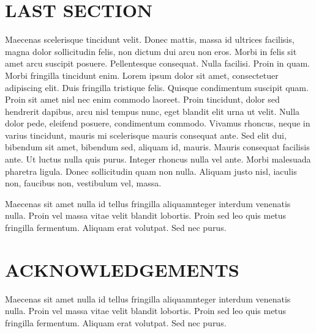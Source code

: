 \documentclass[dvips,11pt,twoside]{article}
\begin{document}
\section{\large\bf LAST SECTION}  
Maecenas scelerisque tincidunt velit.  Donec mattis, massa id ultrices
facilisis, magna dolor sollicitudin felis, non dictum dui arcu non
eros.  Morbi in felis sit amet arcu suscipit posuere.  Pellentesque
consequat.  Nulla facilisi.  Proin in quam.  Morbi fringilla tincidunt
enim.  Lorem ipsum dolor sit amet, consectetuer adipiscing elit.  Duis
fringilla tristique felis.  Quisque condimentum suscipit quam.  Proin
sit amet nisl nec enim commodo laoreet.  Proin tincidunt, dolor sed
hendrerit dapibus, arcu nisl tempus nunc, eget blandit elit urna ut
velit.  Nulla dolor pede, eleifend posuere, condimentum commodo.
Vivamus rhoncus, neque in varius tincidunt, mauris mi scelerisque
mauris consequat ante.  Sed elit dui, bibendum sit amet, bibendum sed,
aliquam id, mauris.  Mauris consequat facilisis ante.  Ut luctus nulla
quis purus.  Integer rhoncus nulla vel ante.  Morbi malesuada pharetra
ligula.  Donec sollicitudin quam non nulla.  Aliquam justo nisl,
iaculis non, faucibus non, vestibulum vel, massa.  

Maecenas sit amet nulla id tellus
fringilla aliquamnteger interdum venenatis nulla.  Proin vel massa
vitae velit blandit lobortis.  Proin sed leo quis metus fringilla
fermentum.  Aliquam erat volutpat.  Sed nec purus. 

\section{\large\bf ACKNOWLEDGEMENTS}
Maecenas sit amet nulla id tellus
fringilla aliquamnteger interdum venenatis nulla.  Proin vel massa
vitae velit blandit lobortis.  Proin sed leo quis metus fringilla
fermentum.  Aliquam erat volutpat.  Sed nec purus. 
\end{document}
